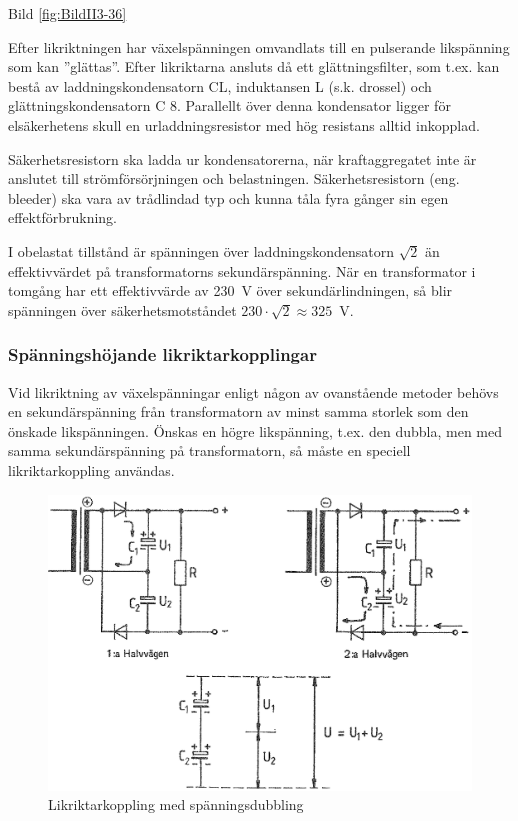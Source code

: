 Bild \ref{fig:BildII3-36}

Efter likriktningen har växelspänningen omvandlats till en pulserande
likspänning som kan ''glättas''. Efter likriktarna ansluts då ett
glättningsfilter, som t.ex. kan bestå av laddningskondensatorn CL,
induktansen L (s.k. drossel) och glättningskondensatorn C 8.
Parallellt över denna kondensator ligger för elsäkerhetens skull en
urladdningsresistor med hög resistans alltid inkopplad.

Säkerhetsresistorn ska ladda ur kondensatorerna, när kraftaggregatet
inte är anslutet till strömförsörjningen och
belastningen. Säkerhetsresistorn (eng. bleeder) ska vara av
trådlindad typ och kunna tåla fyra gånger sin egen effektförbrukning.

I obelastat tillstånd är spänningen över laddningskondensatorn
\(\sqrt{2}\) än effektivvärdet på transformatorns
sekundärspänning. När en transformator i tomgång har ett effektivvärde
av 230~V över sekundärlindningen, så blir spänningen över
säkerhetsmotståndet \(230\cdot\sqrt{2} \approx 325\)~V.

\subsubsection{Spänningshöjande likriktarkopplingar}

Vid likriktning av växelspänningar enligt någon av ovanstående metoder
behövs en sekundärspänning från transformatorn av minst samma storlek
som den önskade likspänningen. Önskas en högre likspänning, t.ex. den
dubbla, men med samma sekundärspänning på transformatorn, så måste en
speciell likriktarkoppling användas.

\begin{figure}
\includegraphics[width=\textwidth]{images/bild_2_3-37.png}
\caption{Likriktarkoppling med spänningsdubbling}
\label{fig:BildII3-37}
\end{figure}

